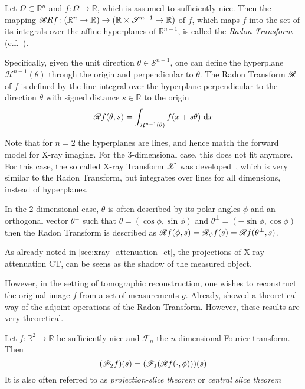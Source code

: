 \begin{definition}
	Let \(\Omega \subset \mathbb{R}^n\) and \(f\colon \Omega \to \mathbb{R}\), which is assumed
	to sufficiently nice. Then the mapping \(\radon{R}f\colon (\mathbb{R}^n \to \mathbb{R})
	\to (\mathbb{R} \times \mathscr{S}^{n-1} \to \mathbb{R})\) of \(f\), which maps \(f\) into
	the set of its integrals over the affine hyperplanes of \(\mathbb{R}^{n-1}\), is called the
	\textit{Radon Transform} (c.f.~\cite{natterer_mathematics_1986,buzug_computed_2008}).

\end{definition}
Specifically, given the unit direction \(\theta \in \mathcal{S}^{n-1}\), one can define the
hyperplane \(\mathcal{H}^{n-1}(\theta)\) through the origin and perpendicular to \(\theta\).
The Radon Transform \(\mathscr{R}\) of \(f\) is defined by the line integral over the
hyperplane perpendicular to the direction \(\theta\) with signed distance \(s \in
\mathbb{R}\) to the origin
\[ \mathscr{R} f(\theta, s) = \int_{\mathcal{H}^{n-1}(\theta)} f(x + s\theta) \, \, \mathrm{d}x \]

Note that for \(n=2\) the hyperplanes are lines, and hence match the forward model for X-ray
imaging. For the 3-dimensional case, this does not fit anymore. For this case, the so called X-ray
Transform \(\mathscr{X}\) was developed~\cite{solmon_x-ray_1976}, which is very similar to the Radon
Transform, but integrates over lines for all dimensions, instead of hyperplanes.

In the \(2\)-dimensional case, \(\theta\) is often described by its polar angles \(\phi\) and an
orthogonal vector \(\theta^\perp\) such that
\( \theta = (\cos \phi, \sin \phi)\) and \(\theta^\perp = (-\sin\phi, \cos\phi)\)
then the Radon Transform is described as \( \mathscr{R} f(\phi, s) = \mathscr{R}_\phi f(s) = \mathscr{R} f(\theta^\perp, s)\).

As already noted in \autoref{sec:xray_attenuation_ct}, the projections of X-ray attenuation CT, can
be seens as the shadow of the measured object.

However, in the setting of tomographic reconstruction, one wishes to reconstruct the original image
\(f\) from a set of measurements \(g\). Already, \citeauthor*{radon_uber_1917} showed a theoretical
way of the adjoint operations of the Radon Transform. However, these results are very theoretical.

\begin{definition}\label{def:fourier_slice_theorem}
	Let \(f\colon \mathbb{R}^2 \to \mathbb{R}\) be sufficiently nice and \(\mathscr{F}_n\) the
	\(n\)-dimensional Fourier transform. Then
	\[ (\mathscr{F}_2f)(s) = (\mathscr{F}_1(\mathscr{R} f(\cdot, \phi)))(s) \]
	It is also often referred to as \textit{projection-slice theorem} or \textit{central slice theorem}
\end{definition}

